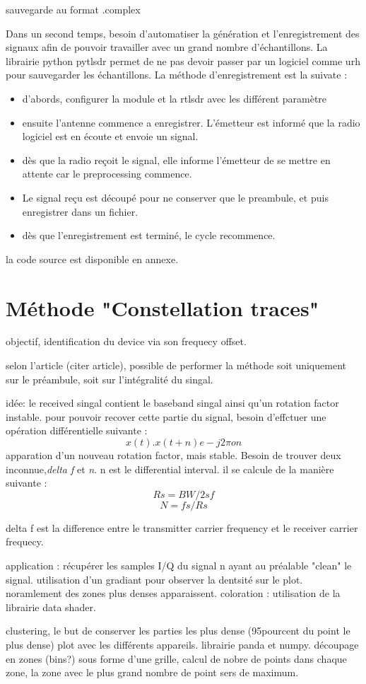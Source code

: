 sauvegarde au format .complex



Dans un second temps, besoin d'automatiser la génération et l'enregistrement des signaux afin de pouvoir travailler avec un grand nombre d'échantillons. La librairie python pytlsdr permet de ne pas devoir passer par un logiciel comme urh pour sauvegarder les échantillons. La méthode d'enregistrement est la suivate :

\begin{itemize}
\item d'abords, configurer la module et la rtlsdr avec les différent paramètre
\item ensuite l'antenne commence a enregistrer. L'émetteur est informé que la radio logiciel est en écoute et envoie un signal. 
\item dès que la radio reçoit le signal, elle informe l'émetteur de se mettre en attente car le preprocessing commence.
\item Le signal reçu est découpé pour ne conserver que le preambule, et puis enregistrer dans un fichier.
\item dès que l'enregistrement est terminé, le cycle recommence.
\end{itemize}

la code source est disponible en annexe.


\section{Méthode "Constellation traces"}

objectif, identification du device via son frequecy offset.

selon l'article (citer article), possible de performer la méthode soit uniquement sur le  préambule, soit sur l'intégralité du singal. 

idée: le received singal contient le baseband singal ainsi qu'un rotation factor instable. pour pouvoir recover cette partie du signal, besoin d'effctuer une opération différentielle suivante : $$ x(t) . x(t+n) e -j2\pi on $$
apparation d'un nouveau rotation factor, mais stable. Besoin de trouver deux inconnue,\textit{delta f} et \textit{n}. n est le differential interval. il se calcule de la manière suivante : $$ Rs = BW / 2sf $$ 
$$ N = fs / Rs $$

delta f est la difference entre le transmitter carrier frequency et le receiver carrier frequecy.

application : récupérer les samples I/Q du signal n ayant au préalable "clean" le signal. utilisation d'un gradiant pour observer la dentsité sur le plot. noramlement des zones plus denses apparaissent.
coloration : utilisation de la librairie data shader. 


clustering, le but de conserver les parties les plus dense (95pourcent du point le plus dense) plot avec les différents appareils.
librairie panda et numpy. découpage en zones (bins?) sous forme d'une grille, calcul de nobre de points dans chaque zone, la zone avec le plus grand nombre de point sers de maximum. 
